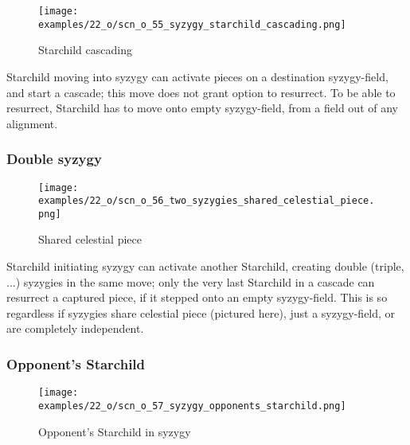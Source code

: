 \vspace*{-1.2\baselineskip}
\noindent
\begin{figure}[!h]
\texttt{[image: examples/22\_o/scn\_o\_55\_syzygy\_starchild\_cascading.png]}
\caption{Starchild cascading}
\label{fig:scn_o_55_syzygy_starchild_cascading}
\end{figure}

Starchild moving into syzygy can activate pieces on a destination syzygy-field,
and start a cascade; this move does not grant option to resurrect. To be able to
resurrect, Starchild has to move onto empty syzygy-field, from a field out of
any alignment.

\clearpage %

\subsubsection*{Double syzygy}
\label{sec:One/Starchild/Syzygy/Double syzygy}

\vspace*{-1.2\baselineskip}
\noindent
\begin{figure}[!h]
\texttt{[image: examples/22\_o/scn\_o\_56\_two\_syzygies\_shared\_celestial\_piece.png]}
\caption{Shared celestial piece}
\label{fig:scn_o_56_two_syzygies_shared_celestial_piece}
\end{figure}

Starchild initiating syzygy can activate another Starchild, creating double
(triple, ...) syzygies in the same move; only the very last Starchild in a
cascade can resurrect a captured piece, if it stepped onto an empty syzygy-field.
This is so regardless if syzygies share celestial piece (pictured here), just a
syzygy-field, or are completely independent.

\clearpage %

\subsubsection*{Opponent's Starchild}
\label{sec:One/Starchild/Syzygy/Opponent's Starchild}

\vspace*{-1.2\baselineskip}
\noindent
\begin{figure}[!h]
\texttt{[image: examples/22\_o/scn\_o\_57\_syzygy\_opponents\_starchild.png]}
\caption{Opponent's Starchild in syzygy}
\label{fig:scn_o_57_syzygy_opponents_starchild}
\end{figure}

